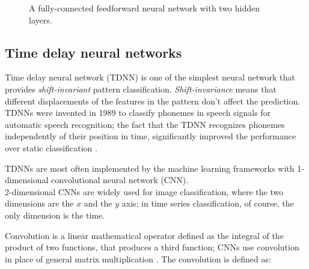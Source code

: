 \begin{center}
	\begin{figure}[ht!]
		\caption{A fully-connected feedforward neural network with two hidden layers.}
	\end{figure}
\end{center}

\subsection{Time delay neural networks}
Time delay neural network (TDNN) is one of the simplest neural network that provides \textit{shift-invariant} pattern classification. \textit{Shift-invariance} means that different displacements of the features in the pattern don't affect the prediction. TDNNs were invented in 1989 to classify phonemes in speech signals for automatic speech recognition; the fact that the TDNN recognizes phonemes independently of their position in time, significantly improved the performance over static classification \cite{Wai89}.
\bigbreak

TDNNs are most often implemented by the machine learning frameworks with 1-dimensional convolutional neural network (CNN).\\
2-dimensional CNNs are widely used for image classification, where the two dimensions are the $x$ and the $y$ axis; in time series classification, of course, the only dimension is the time.
\bigbreak

Convolution is a linear mathematical operator defined as the integral of the product of two functions, that produces a third function; CNNs use convolution in place of general matrix multiplication \cite{Goo16}. The convolution is defined as:

